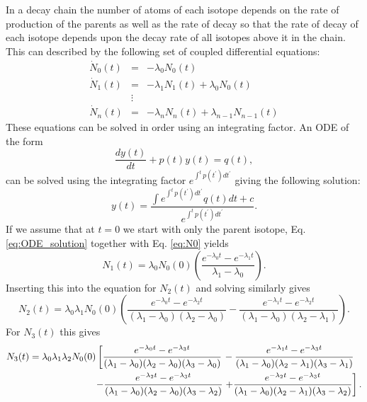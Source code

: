 \documentclass[11pt]{article}
\begin{document}
In a decay chain the number of atoms of each isotope depends on the rate of production of the parents as well as the rate of decay so that the rate of decay of each isotope depends upon the decay rate of all isotopes above it in the chain. This can described by the following set of coupled differential equations:
\begin{equation}
\label{eq:decay_chain}
\begin{array}{lcl}\dot{N}_0(t)&=&-\lambda_0N_0(t)\\
\dot{N}_1(t)&=&-\lambda_1N_1(t)+\lambda_0N_0(t)\\
~&\vdots&~\\
\dot{N}_n(t)&=&-\lambda_nN_n(t)+\lambda_{n-1}N_{n-1}(t)
\end{array}
\end{equation}
These equations can be solved in order using an integrating factor. An ODE of the form 
\begin{equation}
\label{eq:integrating_factor}
\frac{dy(t)}{dt}+p(t)y(t)=q(t),
\end{equation}
can be solved using the integrating factor $e^{\int^t p(t^{\prime})dt^{\prime}}$ giving the following solution:
\begin{equation}
\label{eq:ODE_solution}
y(t)=\frac{\int e^{\int^tp(t^{\prime})dt^{\prime}}q(t)dt + c}{e^{\int^tp(t^{\prime})dt^{\prime}}}.
\end{equation}
If we assume that at $t=0$ we start with only the parent isotope, Eq. \ref{eq:ODE_solution} together with Eq. \ref{eq:N0} yields
\[
N_1(t)=\lambda_0N_0(0)\left(\frac{e^{-\lambda_0t}-e^{-\lambda_1t}}{\lambda_1-\lambda_0}\right).
\]
Inserting this into the equation for $N_2(t)$ and solving similarly gives
\[
N_2(t)=\lambda_0\lambda_1N_0(0)\left(\frac{e^{-\lambda_0t}-e^{-\lambda_2t}}{(\lambda_1-\lambda_0)(\lambda_2-\lambda_0)}-\frac{e^{-\lambda_1t}-e^{-\lambda_2t}}{(\lambda_1-\lambda_0)(\lambda_2-\lambda_1)}\right).
\]
For $N_3(t)$ this gives
\begin{align}
\label{eq:N3}
N_3(t)=\lambda_0\lambda_1\lambda_2N_0(0)\left[\frac{e^{-\lambda_0t}-e^{-\lambda_3t}}{(\lambda_1-\lambda_0)(\lambda_2-\lambda_0)(\lambda_3-\lambda_0)}\right.&-\frac{e^{-\lambda_1t}-e^{-\lambda_3t}}{(\lambda_1-\lambda_0)(\lambda_2-\lambda_1)(\lambda_3-\lambda_1)}\notag\\-\frac{e^{-\lambda_2t}-e^{-\lambda_3t}}{(\lambda_1-\lambda_0)(\lambda_2-\lambda_0)(\lambda_3-\lambda_2)}&\left.+\frac{e^{-\lambda_2t}-e^{-\lambda_3t}}{(\lambda_1-\lambda_0)(\lambda_2-\lambda_1)(\lambda_3-\lambda_2)}\right].
\end{align}
\end{document}
